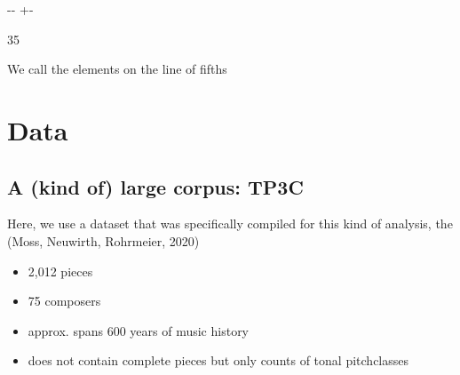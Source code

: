 \documentclass[letterpaper,10pt,english]{sphinxmanual}
\newlength\nbsphinxcodecellspacing
\begin{document}
{

\kern-\sphinxverbatimsmallskipamount\kern-\baselineskip
\kern+\FrameHeightAdjust\kern-\fboxrule
\vspace{\nbsphinxcodecellspacing}

\begin{sphinxVerbatim}[commandchars=\\\{\}]
\llap{\color{nbsphinxout}[5]:\,\hspace{\fboxrule}\hspace{\fboxsep}}35
\end{sphinxVerbatim}
}

We call the elements on the line of fifths 


\section{Data}
\label{\detokenize{05_data-driven_music_history:Data}}

\subsection{A (kind of) large corpus: TP3C}
\label{\detokenize{05_data-driven_music_history:A-(kind-of)-large-corpus:-TP3C}}
Here, we use a dataset that was specifically compiled for this kind of analysis, the  (Moss, Neuwirth, Rohrmeier, 2020)
\begin{itemize}
\item {} 
2,012 pieces

\item {} 
75 composers

\item {} 
approx. spans 600 years of music history

\item {} 
does not contain complete pieces but only counts of tonal pitch\sphinxhyphen{}classes

\end{itemize}

{
\begin{sphinxVerbatim}[commandchars=\\\{\}]
\llap{\color{nbsphinxin}[6]:\,\hspace{\fboxrule}\hspace{\fboxsep}}    

  
  

\end{sphinxVerbatim}
}
\end{document}
